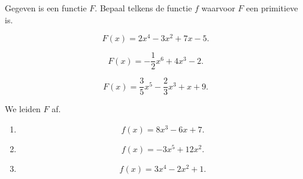 \documentclass{ximera}
\begin{document}

\begin{oefening}{\oefB}

Gegeven is een functie $F$. Bepaal telkens de functie $f$ waarvoor $F$ een primitieve is.

\begin{question}
\[
F(x)=2x^4-3x^2+7x-5.
\]
\end{question}

\begin{question}
\[
F(x)=-\frac12x^6+4x^3-2.
\]
\end{question}

\begin{question}
\[
F(x)=\frac35x^5-\frac23x^3+x+9.
\]
\end{question}

\begin{oplossing}

We leiden $F$ af.

\begin{enumerate}
\item
\[
f(x)=8x^3-6x+7.
\]
\item
\[
f(x)=-3x^5+12x^2.
\]
\item
\[
f(x)=3x^4-2x^2+1.
\]
\end{enumerate}

\end{oplossing}

\end{oefening}


\end{document}
